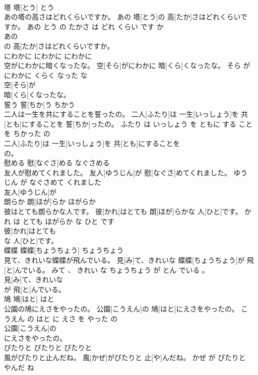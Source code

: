 \documentclass[8pt]{extreport}
\begin{document}
\begin{CJK}{UTF8}{min}
\\	塔	塔[とう]	とう	
\\	あの塔の高さはどれくらいですか。	あの 塔[とう]の 高[たか]さはどれくらいですか。	あの とう の たかさ は どれ くらい です か	
\\	あの
\\	の 高[たか]さはどれくらいですか。			
\\	にわかに	にわかに	にわかに	
\\	空がにわかに暗くなったな。	空[そら]がにわかに 暗[くら]くなったな。	そら が にわかに くらく なった な	
\\	空[そら]が
\\	暗[くら]くなったな。			
\\	誓う	誓[ちか]う	ちかう	
\\	二人は一生を共にすることを誓ったの。	二人[ふたり]は 一生[いっしょう]を 共[とも]にすることを 誓[ちか]ったの。	ふたり は いっしょう を ともに する こと を ちかった の	
\\	二人[ふたり]は 一生[いっしょう]を 共[とも]にすることを
\\	の。			
\\	慰める	慰[なぐさ]める	なぐさめる	
\\	友人が慰めてくれました。	友人[ゆうじん]が 慰[なぐさ]めてくれました。	ゆうじん が なぐさめて くれました	
\\	友人[ゆうじん]が
\\	朗らか	朗[ほが]らか	ほがらか	
\\	彼はとても朗らかな人です。	彼[かれ]はとても 朗[ほが]らかな 人[ひと]です。	かれ は とても ほがらか な ひと です	
\\	彼[かれ]はとても
\\	な 人[ひと]です。			
\\	蝶蝶	蝶蝶[ちょうちょう]	ちょうちょう	
\\	見て、きれいな蝶蝶が飛んでいる。	見[み]て、きれいな 蝶蝶[ちょうちょう]が 飛[と]んでいる。	みて 、 きれい な ちょうちょう が とん でいる 。	
\\	見[み]て、きれいな
\\	が 飛[と]んでいる。			
\\	鳩	鳩[はと]	はと	
\\	公園の鳩にえさをやったの。	公園[こうえん]の 鳩[はと]にえさをやったの。	こうえん の はと に えさ を やった の	
\\	公園[こうえん]の
\\	にえさをやったの。			
\\	ぴたりと	ぴたりと	ぴたりと	
\\	風がぴたりと止んだね。	風[かぜ]がぴたりと 止[や]んだね。	かぜ が ぴたりと やんだ ね	

\end{CJK}
\end{document}
